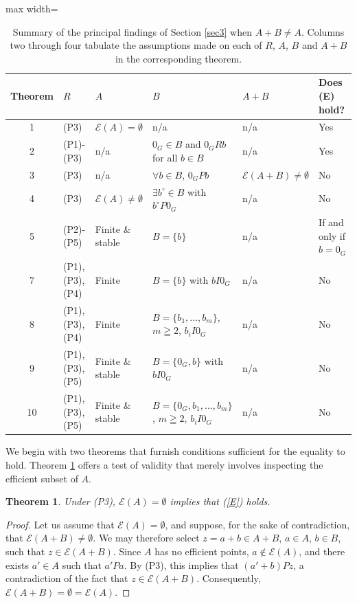 \documentclass[pdflatex,sn-apa,11pt]{sn-jnl}%
\newtheorem{theorem}{Theorem}%
\begin{document}
\begin{table}[ht]
\centering
\begin{adjustbox}{max width=\textwidth}
\begin{tabular}{|c|p{2.25cm}|p{2cm}|p{3.5cm}|p{1.75cm}|p{2.75cm}|}
\hline
\textbf{Theorem} & \textbf{$R$} & \textbf{$A$} & \textbf{$B$} & \textbf{$A+B$} & \textbf{Does (E) hold?} \\
\hline
1 & (P3) & $\mathscr{E}(A)=\emptyset$ & n/a & n/a & Yes \\
\hline
2 & (P1)-(P3) & n/a & $0_G \in B$ and $0_GRb$ for all $b \in B$ & n/a & Yes \\
\hline
3 & (P3) & n/a & $\forall b \in B$, $0_GPb$ & $\mathscr{E}(A+B)\neq \emptyset$ & No \\
\hline
4 & (P3) & $\mathscr{E}(A)\neq \emptyset$ & $\exists b^\circ \in B$ with $b^{\circ}P0_G$ & n/a & No \\
\hline
5 & (P2)-(P5) & Finite \& stable & $B=\{b\}$ & n/a & If and only if $b=0_G$ \\
\hline
7 & (P1), (P3), (P4) & Finite & $B=\{b\}$ with $bI0_G$ & n/a & No \\
\hline
8 & (P1), (P3), (P4) & Finite & $B=\{b_1,\ldots,b_m\}$, $m\geqq 2$, $b_iI0_G$ & n/a & No \\
\hline
9 & (P1), (P3), (P5) & Finite \& stable & $B=\{0_G,b\}$ with $bI0_G$ & n/a & No \\
\hline
10 & (P1), (P3), (P5) & Finite \& stable & $B=\{0_G,b_1,\ldots,b_m\}$, $m\geqq 2$, $b_iI0_G$ & n/a & No \\
\hline
\end{tabular}
\end{adjustbox}
\caption{Summary of the principal findings of Section \ref{sec3} when $A+B \neq A$. Columns two through four tabulate the assumptions made on each of $R$, $A$, $B$ and $A+B$ in the corresponding theorem.}
\label{table1}
\end{table}


We begin with two theorems that furnish conditions sufficient for the equality to hold. Theorem \ref{thm0} offers a test of validity that merely involves inspecting the efficient subset of $A$.  

\begin{theorem}
\label{thm0}
Under (P3), $\mathscr{E}(A) = \emptyset$ implies that (\ref{E}) holds.
\end{theorem}
\begin{proof}
Let us assume that $\mathscr{E}(A) = \emptyset$, and suppose, for the sake of contradiction, that $\mathscr{E}(A+B) \neq \emptyset$. We may therefore select $z = a +b \in A+B$, $a \in A$, $b \in B$, such that $z \in \mathscr{E}(A+B)$. Since $A$ has no efficient points, $a \notin \mathscr{E}(A)$, and there exists $a' \in A$ such that $a'Pa$. By (P3), this implies that $(a'+b)Pz$, a contradiction of the fact that $z \in \mathscr{E}(A+B)$. Consequently, $\mathscr{E}(A+B) = \emptyset = \mathscr{E}(A)$.
\end{proof}
\end{document}
